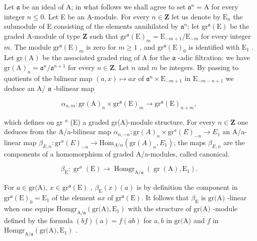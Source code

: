 Let \(\mathfrak{a}\) be an ideal of A; in what follows we shall agree to set \(\mathfrak{a}^n = \mathrm{A}\) for every integer \(n \leqslant 0\). Let E be an A-module. For every \(n \in \mathbf{Z}\) let us denote by \(\mathrm{E}_n\) the submodule of E consisting of the elements annihilated by \(\mathfrak{a}^n\); let \(\mathrm{gr}^{\mathfrak{a}}(\mathrm{E})\) be the graded A-module of type \(\mathbf{Z}\) such that \(\mathrm{gr}^{\mathfrak{a}}(\mathrm{E})_m = \mathrm{E}_{-m+1}/\mathrm{E}_{-m}\) for every integer \(m\). The module \(\mathrm{gr}^{\mathfrak{a}}(\mathrm{E})_m\) is zero for \(m \geqslant 1\) , and \(\mathrm{gr}^{\mathfrak{a}}(\mathrm{E})_0\) is identified with \(\mathrm{E}_1\) . Let \(\mathrm{gr}(\mathrm{A})\) be the associated graded ring of A for the \(\mathfrak{a}\) -adic filtration: we have \(\mathrm{gr}(\mathrm{A})_n = \mathfrak{a}^n/\mathfrak{a}^{n+1}\) for every \(n \in \mathbf{Z}\). Let \(n\) and \(m\) be integers. By passing to quotients of the bilinear map \((a,x) \mapsto ax\) of \(\mathfrak{a}^n \times \mathrm{E}_{-m+1}\) in \(\mathrm{E}_{-m-n+1}\) we deduce an A/ \(\mathfrak{a}\) -bilinear map

\[
\alpha_ {n, m}: \mathrm{gr} (\mathrm{A}) _ {n} \times \mathrm{gr} ^ {\mathfrak {a}} (\mathrm{E}) _ {m} \longrightarrow \mathrm{gr} ^ {\mathfrak {a}} (\mathrm{E}) _ {n + m},\tag{1}
\]

which defines on gr \(^{a}\) (E) a graded gr(A)-module structure. For every \(n \in \mathbf{Z}\) one deduces from the A/a-bilinear map \(\alpha_{n,-n} : \text{gr}(A)_n \times \text{gr}^{a}(E)_{-n} \longrightarrow E_1\) an A/a-linear map \(\beta_{E,n} : \text{gr}^{a}(E)_{-n} \longrightarrow \text{Hom}_{A/\alpha}(\text{gr}(A)_n, E_1)\); the maps \(\beta_{E,n}\) are the components of a homomorphism of graded A/a-modules, called canonical.

\[
\beta_ {\mathrm{E}}: \operatorname{gr} ^ {a} (\mathrm{E}) \longrightarrow \operatorname{Homgr} _ {\mathrm{A} / \mathfrak{a}} (\operatorname{gr} (\mathrm{A}), \mathrm{E} _ {1}).\tag{2}
\]

For \(a \in \text{gr(A)}\), \(x \in \text{gr}^{\mathfrak{a}}(\text{E})\) , \(\beta_{\text{E}}(x)(a)\) is by definition the component in \(\text{gr}^{\mathfrak{a}}(\text{E})_0 = \text{E}_1\) of the element \(ax\) of \(\text{gr}^{\mathfrak{a}}(\text{E})\). It follows that \(\beta_{\text{E}}\) is \(\text{gr(A)}\) -linear when one equips \(\text{Homgr}_{\text{A}/\mathfrak{a}}(\text{gr(A)}, \text{E}_1)\) with the structure of \(\text{gr(A)}\) -module defined by the formula \((bf)(a) = f(ab)\) for \(a, b\) in \(\text{gr(A)}\) and \(f\) in \(\text{Homgr}_{\text{A}/\mathfrak{a}}(\text{gr(A)}, \text{E}_1)\) .


